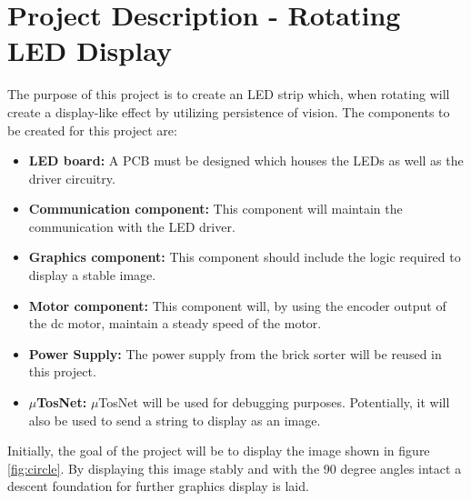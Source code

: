 \documentclass[a4paper,10pt]{article}
\title{}
\author{}
\begin{document}
	\section{Project Description - Rotating LED Display}
	The purpose of this project is to create an LED strip which, when rotating will create a display-like effect by utilizing persistence of vision.
	The components to be created for this project are:
	\begin{itemize}
		\item \textbf{LED board:} A PCB must be designed which houses the LEDs as well as the driver circuitry.
		\item \textbf{Communication component:} This component will maintain the communication with the LED driver.
		\item \textbf{Graphics component:} This component should include the logic required to display a stable image.
		\item \textbf{Motor component:} This component will, by using the encoder output of the dc motor, maintain a steady speed of the motor.
		\item \textbf{Power Supply:} The power supply from the brick sorter will be reused in this project.
		\item \textbf{$\mu$TosNet:} $\mu$TosNet will be used for debugging purposes.
		Potentially, it will also be used to send a string to display as an image.
	\end{itemize}
	Initially, the goal of the project will be to display the image shown in figure \ref{fig:circle}. 
	By displaying this image stably and with the 90 degree angles intact a descent foundation for further graphics display is laid.
	
\end{document}
